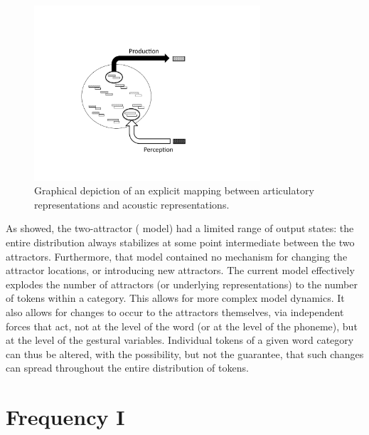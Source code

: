 \begin{figure}[H]

\includegraphics[width=0.75\textwidth]{figures/SeparateReps.pdf}\caption{\label{fig:P-toP-mapping}Graphical depiction of an explicit mapping
between articulatory representations and acoustic representations. }

\end{figure}

As  showed, the two-attractor (
model) had a limited range of output states: the entire distribution
always stabilizes at some point intermediate between the two attractors.
Furthermore, that model contained no mechanism for changing the attractor
locations, or introducing new attractors. The current model effectively
explodes the number of attractors (or underlying representations)
to the number of tokens within a category. This allows for more complex
model dynamics. It also allows for changes to occur to the attractors
themselves, via independent forces that act, not at the level of the
word (or at the level of the phoneme), but at the level of the gestural
variables. Individual tokens of a given word category can thus be
altered, with the possibility, but not the guarantee, that such changes
can spread throughout the entire distribution of tokens.

\section{\label{sec:Frequency-I}Frequency I}

